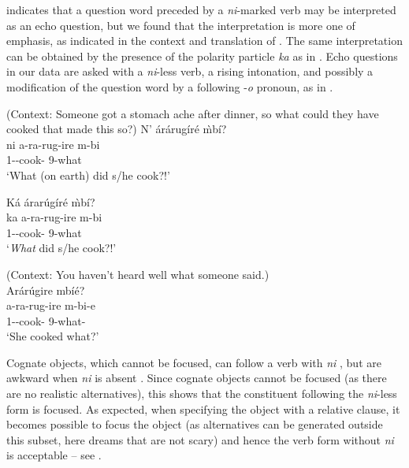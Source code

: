 \documentclass[output=paper]{langscibook}
\begin{document}
\z

\citet[footnote~13]{Muriungi2005} indicates that a question word preceded by a \textit{ni}-marked verb may be interpreted as an echo question, but we found that the interpretation is more one of emphasis, as indicated in the context and translation of . The same interpretation can be obtained by the presence of the polarity particle \textit{ka} as in . Echo questions in our data are asked with a \textit{ni}-less verb, a rising intonation, and possibly a modification of the question word by a following -\textit{o} pronoun, as in .

\ea
\label{bkm:Ref94519675}(Context: Someone got a stomach ache after dinner, so what could they have cooked that made this so?)
\ea
N’ árárugíré \`{m}bí?\label{emphwhat}\\
\gll
ni  a-ra-rug-ire  m-bi\\
\FOC{}  1\SM-\YPST{}-cook-\PFV{} 9-what\\
\glt
‘What (on earth) did s/he cook?!’

\ex
Ká árarúgíré \`{m}bí?\label{bkm:Ref94519626}\\
\gll
ka  a-ra-rug-ire  m-bi\\
\Q{} 1\SM-\YPST{}-cook-\PFV{} 9-what\\
\glt
‘\textit{What} did s/he cook?!’
\z

\ex
\label{bkm:Ref94519598}
(Context: You haven’t heard well what someone said.)\\
Arárúgire mbíé?\\
\gll
a-ra-rug-ire  m-bi-e\\
1\SM-\YPST{}-cook-\PFV{} 9-what-\ECHO{}\\
\glt
‘She cooked what?’
\z


Cognate objects, which cannot be focused, can follow a verb with \textit{ni} , but are awkward when \textit{ni} is absent . Since cognate objects cannot be focused (as there are no realistic alternatives), this shows that the constituent following the \textit{ni}-less form is focused. As expected, when specifying the object with a relative clause, it becomes possible to focus the object (as alternatives can be generated outside this subset, here dreams that are not scary) and hence the verb form without \textit{ni} is acceptable – see .
\end{document}
